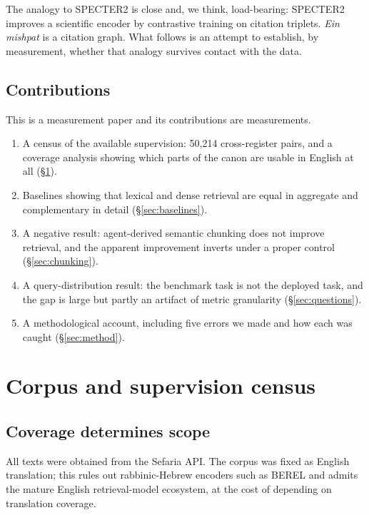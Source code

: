 \documentclass[11pt,a4paper]{article}
\begin{document}
The analogy to SPECTER2 \cite{specter2} is close and, we think, load-bearing:
SPECTER2 improves a scientific encoder by contrastive training on citation
triplets. \emph{Ein mishpat} is a citation graph. What follows is an attempt to
establish, by measurement, whether that analogy survives contact with the data.

\subsection{Contributions}

This is a measurement paper and its contributions are measurements.

\begin{enumerate}[itemsep=2pt]
\item A census of the available supervision: 50{,}214 cross-register pairs,
      and a coverage analysis showing which parts of the canon are usable in
      English at all (\S\ref{sec:census}).
\item Baselines showing that lexical and dense retrieval are equal in aggregate
      and complementary in detail (\S\ref{sec:baselines}).
\item A negative result: agent-derived semantic chunking does not improve
      retrieval, and the apparent improvement inverts under a proper control
      (\S\ref{sec:chunking}).
\item A query-distribution result: the benchmark task is not the deployed task,
      and the gap is large but partly an artifact of metric granularity
      (\S\ref{sec:questions}).
\item A methodological account, including five errors we made and how each was
      caught (\S\ref{sec:method}).
\end{enumerate}

\section{Corpus and supervision census}\label{sec:census}

\subsection{Coverage determines scope}

All texts were obtained from the Sefaria API. The corpus was fixed as English
translation; this rules out rabbinic-Hebrew encoders such as BEREL
\cite{berel} and admits the mature English retrieval-model ecosystem, at the
cost of depending on translation coverage.
\end{document}
